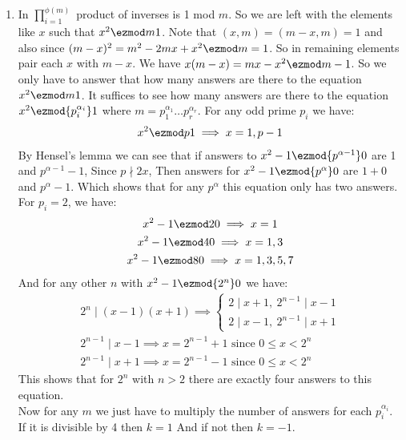 \begin{enumerate}[label=\textbf{(\textit{\roman*})}]
    \item 
        In $\prod_{i = 1}^{\phi(m)}$ product of inverses is 1 mod $m$. So we are left with the elements like $x$ such that $x^2 \ezmod m 1$. Note that $(x, m) = (m - x, m) = 1$ and also since $(m - x)^2 = m^2 - 2mx + x^2 \ezmod m = 1$. So in remaining elements pair each $x$ with $m - x$. We have $x (m-x) = mx - x^2 \ezmod m -1$. So we only have to answer that how many answers are there to the equation $x^2 \ezmod m 1$. It suffices to see how many answers are there to the equation $x^2 \ezmod{p_i^{\alpha_i}} 1$ where $m = p_1^{\alpha_1}\dots p_r^{\alpha_r}$. For any odd prime $p_i$ we have:
        \begin{gather*}
            x^2 \ezmod p 1 \implies x = 1, p - 1 
        \end{gather*}
        By Hensel's lemma we can see that if answers to $x^2 - 1 \ezmod{p^{\alpha - 1}} 0$ are 1 and $p^{\alpha - 1} - 1$, Since $p \nmid 2x$, Then answers for $x^2 - 1 \ezmod{p^\alpha} 0$ are $1 + 0$ and $p^\alpha - 1$. Which shows that for any $p^\alpha$ this equation only has two answers.
        For $p_i = 2$, we have:
        \begin{gather*}
            x^2 - 1 \ezmod 2 0 \implies x = 1 \\
            x^2 - 1 \ezmod 4 0 \implies x = 1, 3 \\
            x^2 - 1 \ezmod 8 0 \implies x = 1, 3, 5, 7
        \end{gather*}
        And for any other $n$ with $x^2 - 1 \ezmod{2^n} 0$ we have:
        \begin{gather*}
            2^n \mid (x - 1)(x + 1) \implies 
            \begin{cases}
                2 \mid x + 1 , \ 2^{n - 1} \mid x - 1 \\
                2 \mid x - 1, \ 2^{n - 1} \mid x + 1
            \end{cases} \\
            2^{n - 1} \mid x - 1 \implies x = 2^{n - 1} + 1 \text{ since } 0 \le x < 2^n \\
            2^{n - 1} \mid x + 1 \implies x = 2^{n - 1} - 1 \text{ since } 0 \le x < 2^n
        \end{gather*}
        This shows that for $2^n$ with $n > 2$ there are exactly four answers to this equation. \\
        Now for any $m$ we just have to multiply the number of answers for each $p_i^{\alpha_i}$. If it is divisible by 4 then $k = 1$ And if not then $k = -1$.

\end{enumerate}

